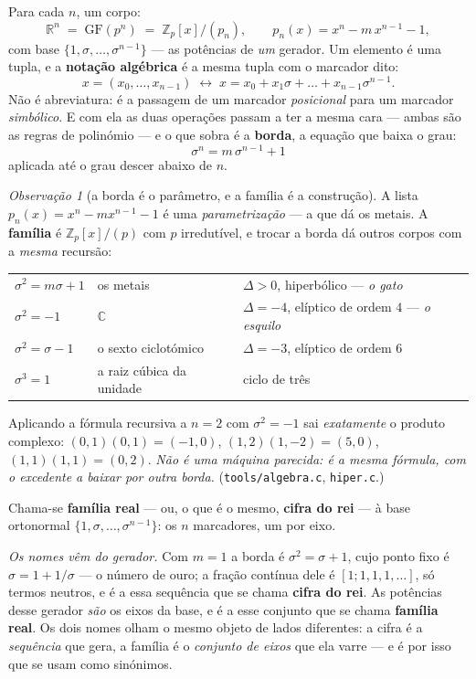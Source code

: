 \documentclass[11pt]{article}
\newcommand{\code}[1]{\texttt{\small #1}}
\newcommand{\Z}{\mathbb Z}
\newcommand{\R}{\mathbb R}
\newcommand{\C}{\mathbb C}
\newcommand{\GF}{\mathrm{GF}}
\theoremstyle{plain}
\theoremstyle{remark}
\newtheorem{obs}{Observação}
\begin{document}
Para cada $n$, um corpo:
\[
  \R^n \;=\; \GF(p^n) \;=\; \Z_p[x]/(p_n),\qquad p_n(x)=x^n-m\,x^{n-1}-1 ,
\]
com base $\{1,\sigma,\dots,\sigma^{n-1}\}$ --- as potências de \emph{um} gerador. Um elemento é uma
tupla, e a \textbf{notação algébrica} é a mesma tupla com o marcador dito:
\[
  x=(x_0,\dots,x_{n-1}) \;\longleftrightarrow\; x = x_0 + x_1\sigma + \dots + x_{n-1}\sigma^{n-1}.
\]
Não é abreviatura: é a passagem de um marcador \emph{posicional} para um marcador \emph{simbólico}.
E com ela as duas operações passam a ter a mesma cara --- ambas são as regras de polinómio --- e o
que sobra é a \textbf{borda}, a equação que baixa o grau:
\[
  \boxed{\;\sigma^n = m\,\sigma^{n-1} + 1\;}
\]
aplicada até o grau descer abaixo de $n$.

\begin{obs}[a borda é o parâmetro, e a família é a construção]
A lista $p_n(x)=x^n-mx^{n-1}-1$ é uma \emph{parametrização} --- a que dá os metais. A
\textbf{família} é $\Z_p[x]/(p)$ com $p$ irredutível, e trocar a borda dá outros corpos com a
\emph{mesma} recursão:
\begin{center}
\begin{tabular}{lll}
\toprule
$\sigma^2=m\sigma+1$ & os metais & $\Delta>0$, hiperbólico --- \emph{o gato} \\
$\sigma^2=-1$ & $\C$ & $\Delta=-4$, elíptico de ordem $4$ --- \emph{o esquilo} \\
$\sigma^2=\sigma-1$ & o sexto ciclotómico & $\Delta=-3$, elíptico de ordem $6$ \\
$\sigma^3=1$ & a raiz cúbica da unidade & ciclo de três \\
\bottomrule
\end{tabular}
\end{center}
Aplicando a fórmula recursiva a $n=2$ com $\sigma^2=-1$ sai \emph{exatamente} o produto complexo:
$(0,1)(0,1)=(-1,0)$, $(1,2)(1,-2)=(5,0)$, $(1,1)(1,1)=(0,2)$. \emph{Não é uma máquina parecida: é a
mesma fórmula, com o excedente a baixar por outra borda.} (\code{tools/algebra.c}, \code{hiper.c}.)
\end{obs}

\noindent Chama-se \textbf{família real} --- ou, o que é o mesmo, \textbf{cifra do rei} --- à base
ortonormal $\{1,\sigma,\dots,\sigma^{n-1}\}$: os $n$ marcadores, um por eixo.

\emph{Os nomes vêm do gerador.} Com $m=1$ a borda é $\sigma^2=\sigma+1$, cujo ponto fixo é
$\sigma=1+1/\sigma$ --- o número de ouro; a fração contínua dele é $[1;1,1,1,\dots]$, só termos
neutros, e é a essa sequência que se chama \textbf{cifra do rei}. As potências desse gerador
\emph{são} os eixos da base, e é a esse conjunto que se chama \textbf{família real}. Os dois nomes
olham o mesmo objeto de lados diferentes: a cifra é a \emph{sequência} que gera, a família é o
\emph{conjunto de eixos} que ela varre --- e é por isso que se usam como sinónimos.
\end{document}
